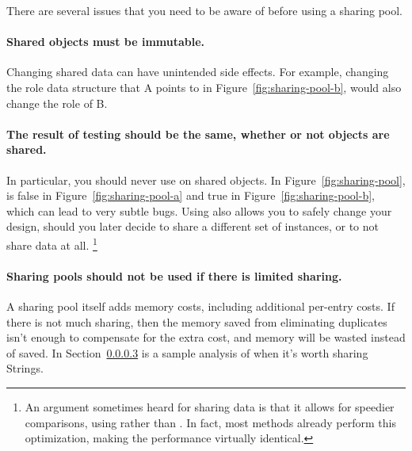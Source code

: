 


There are several issues that you need to be aware of before using a sharing
pool.
\paragraph{Shared objects must be immutable.} Changing shared data can
have unintended side effects. For example, 
changing the role data structure that A points to in
Figure~\ref{fig:sharing-pool-b}, would also change the role of B.

\paragraph{The result of  testing should be the same,
whether or not objects are shared.}
In particular, you should never use \code{==} on shared objects.
In Figure~\ref{fig:sharing-pool},  is false in
Figure~\ref{fig:sharing-pool-a} and true in Figure~\ref{fig:sharing-pool-b},
 which can lead to very subtle bugs. Using  also allows you to
 safely change your design, should you later decide to share a different set of
 instances, or to not share data at all. \footnote{An argument sometimes heard for sharing data is that it
 allows for speedier comparisons, using \code{==} rather than .
 In fact, most
  methods already perform this optimization, making the performance virtually identical.}
 
\paragraph{Sharing pools should not be used if there is limited sharing.}
A sharing pool itself adds
memory costs, including additional per-entry costs. If there is not
much sharing, then the memory saved from
eliminating duplicates isn't enough to compensate for the
extra cost, and memory will be wasted instead of saved.  In Section~\ref{} is
a sample analysis of when it's worth sharing Strings.


